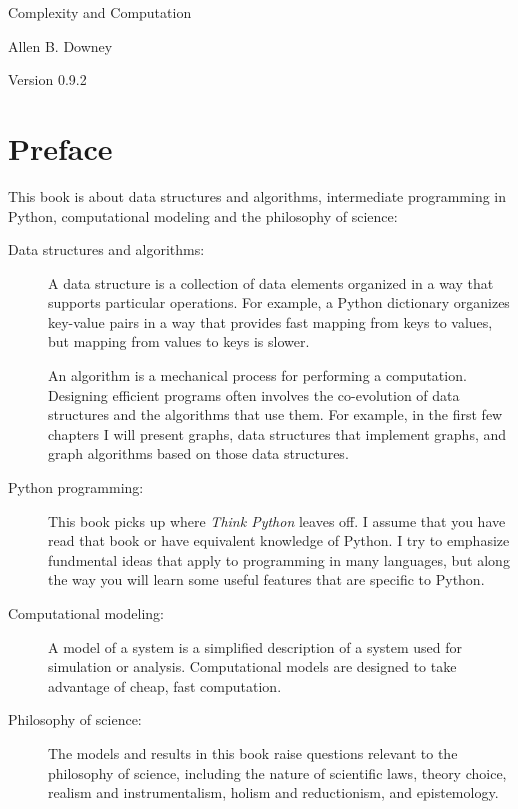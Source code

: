 \documentclass[10pt]{book}
\newcommand{\thetitle}{Complexity and Computation}
\newcommand{\theversion}{0.9.2}
\begin{document}

\begin{htmlonly}


{\Large \thetitle}

{\large Allen B. Downey}

Version \theversion

\setcounter{chapter}{-1}

\end{htmlonly}

\chapter{Preface}

This book is about data structures and algorithms, intermediate
programming in Python, computational modeling and
the philosophy of science:

\begin{description}

\item[Data structures and algorithms:] A data structure is a
  collection of data elements organized in a way that supports
  particular operations.  For example, a Python dictionary organizes
  key-value pairs in a way that provides fast mapping from keys to
  values, but mapping from values to keys is slower.

An algorithm is a mechanical process for performing a computation.
Designing efficient programs often involves the co-evolution of data
structures and the algorithms that use them.  For example, in the
first few chapters I will present graphs, data structures that
implement graphs, and graph algorithms based on those data structures.

\item[Python programming:] This book picks up where {\em Think Python}
  leaves off.  I assume that you have read that book or have
  equivalent knowledge of Python.  I try to emphasize fundmental ideas
  that apply to programming in many languages, but along the way you
  will learn some useful features that are specific to Python.

\item[Computational modeling:] A model of a system is a simplified
  description of a system used for simulation or analysis.
  Computational models are designed to take advantage of cheap, fast
  computation.

\item[Philosophy of science:] The models and results in this book
  raise questions relevant to the philosophy of science,
  including the nature of scientific laws, theory choice, realism and
  instrumentalism, holism and reductionism, and epistemology.

\end{description}
\end{document}
